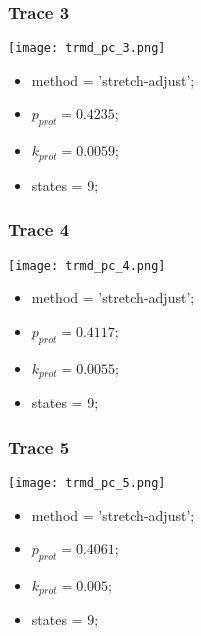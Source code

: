 \subsubsection{Trace 3}
\begin{minipage}[c]{0.7\textwidth}
	\texttt{[image: trmd\_pc\_3.png]}
\end{minipage}
\hfill
\begin{minipage}[c]{0.45\textwidth}
	\begin{itemize}
		\item method = 'stretch-adjust';
		\item $p_{prot}=0.4235$;
		\item $k_{prot}=0.0059$;
		\item states = 9;
	\end{itemize}
\end{minipage}

\subsubsection{Trace 4}
\begin{minipage}[c]{0.7\textwidth}
	\texttt{[image: trmd\_pc\_4.png]}
\end{minipage}
\hfill
\begin{minipage}[c]{0.45\textwidth}
	\begin{itemize}
		\item method = 'stretch-adjust';
		\item $p_{prot}=0.4117$;
		\item $k_{prot}=0.0055$;
		\item states = 9;
	\end{itemize}
\end{minipage}

\subsubsection{Trace 5}
\begin{minipage}[c]{0.7\textwidth}
	\texttt{[image: trmd\_pc\_5.png]}
\end{minipage}
\hfill
\begin{minipage}[c]{0.45\textwidth}
	\begin{itemize}
		\item method = 'stretch-adjust';
		\item $p_{prot}=0.4061$;
		\item $k_{prot}=0.005$;
		\item states = 9;
	\end{itemize}
\end{minipage}

